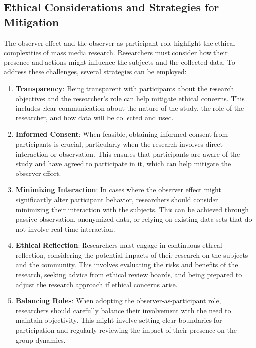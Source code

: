 \documentclass[
]{book}
\begin{document}
\subsection*{Ethical Considerations and Strategies for Mitigation}\label{ethical-considerations-and-strategies-for-mitigation}

The observer effect and the observer-as-participant role highlight the ethical complexities of mass media research. Researchers must consider how their presence and actions might influence the subjects and the collected data. To address these challenges, several strategies can be employed:

\begin{enumerate}
\def\labelenumi{\arabic{enumi}.}
\item
  \textbf{Transparency}: Being transparent with participants about the research objectives and the researcher's role can help mitigate ethical concerns. This includes clear communication about the nature of the study, the role of the researcher, and how data will be collected and used.
\item
  \textbf{Informed Consent}: When feasible, obtaining informed consent from participants is crucial, particularly when the research involves direct interaction or observation. This ensures that participants are aware of the study and have agreed to participate in it, which can help mitigate the observer effect.
\item
  \textbf{Minimizing Interaction}: In cases where the observer effect might significantly alter participant behavior, researchers should consider minimizing their interaction with the subjects. This can be achieved through passive observation, anonymized data, or relying on existing data sets that do not involve real-time interaction.
\item
  \textbf{Ethical Reflection}: Researchers must engage in continuous ethical reflection, considering the potential impacts of their research on the subjects and the community. This involves evaluating the risks and benefits of the research, seeking advice from ethical review boards, and being prepared to adjust the research approach if ethical concerns arise.
\item
  \textbf{Balancing Roles}: When adopting the observer-as-participant role, researchers should carefully balance their involvement with the need to maintain objectivity. This might involve setting clear boundaries for participation and regularly reviewing the impact of their presence on the group dynamics.
\end{enumerate}
\end{document}
